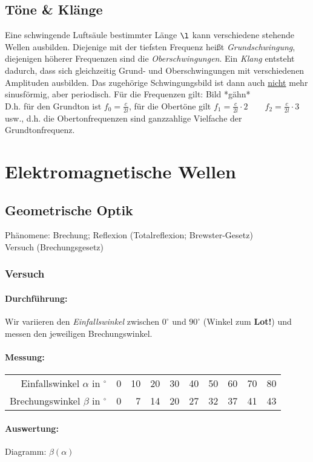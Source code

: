 \documentclass[a4paper]{scrartcl}
\begin{document}
\subsection{Töne \& Klänge}
Eine schwingende Luftsäule bestimmter Länge \(\l\) kann verschiedene stehende
Wellen ausbilden. Diejenige mit der tiefsten Frequenz heißt
\emph{Grundschwingung}, diejenigen höherer Frequenzen sind die
\emph{Oberschwingungen}. Ein \emph{Klang} entsteht dadurch, dass sich
gleichzeitig Grund- und Oberschwingungen mit verschiedenen Amplituden
ausbilden. Das zugehörige Schwingungsbild ist dann auch \underline{nicht} mehr
sinusförmig, aber periodisch. Für die Frequenzen gilt: Bild *gähn*\\
D.h. für den Grundton ist \(f_0 = \frac{c}{2l}\), für die Obertöne gilt \(f_1 =
\frac{c}{2l} \cdot 2\qquad f_2 = \frac{c}{2l} \cdot 3\) usw., d.h. die
Obertonfrequenzen sind ganzzahlige Vielfache der Grundtonfrequenz.

\section{Elektromagnetische Wellen}
\subsection{Geometrische Optik}
Phänomene: Brechung; Reflexion (Totalreflexion; Brewster-Gesetz)\\
Versuch (Brechungsgesetz)
\subsubsection{Versuch}
\paragraph{Durchführung:} Wir variieren den \emph{Einfallswinkel} zwischen
	\(0^\circ\) und \(90^\circ\) (Winkel zum \textbf{Lot!}) und messen den
	jeweiligen Brechungswinkel.
\paragraph{Messung:}
\begin{tabular}{r|r|r|r|r|r|r|r|r|r}
Einfallswinkel \(\alpha\) in \(^\circ\) &
0 & 10 & 20 & 30 & 40 & 50 & 60 & 70 & 80\\
Brechungswinkel \(\beta\) in \(^\circ\) &
0 &  7 & 14 & 20 & 27 & 32 & 37 & 41 & 43
\end{tabular}
\paragraph{Auswertung:} Diagramm: \(\beta(\alpha)\) %
\end{document}

